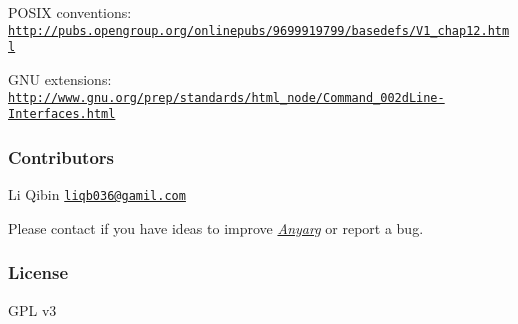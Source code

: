 P\-O\-S\-I\-X conventions\-: \href{http://pubs.opengroup.org/onlinepubs/9699919799/basedefs/V1_chap12.html}{\tt http\-://pubs.\-opengroup.\-org/onlinepubs/9699919799/basedefs/\-V1\-\_\-chap12.\-html}

G\-N\-U extensions\-: \href{http://www.gnu.org/prep/standards/html_node/Command_002dLine-Interfaces.html}{\tt http\-://www.\-gnu.\-org/prep/standards/html\-\_\-node/\-Command\-\_\-002d\-Line-\/\-Interfaces.\-html}

\subsubsection*{Contributors}

Li Qibin \href{mailto:liqb036@gamil.com}{\tt liqb036@gamil.\-com}

Please contact if you have ideas to improve {\itshape \hyperlink{class_anyarg}{Anyarg}} or report a bug.

\subsubsection*{License}

G\-P\-L v3 